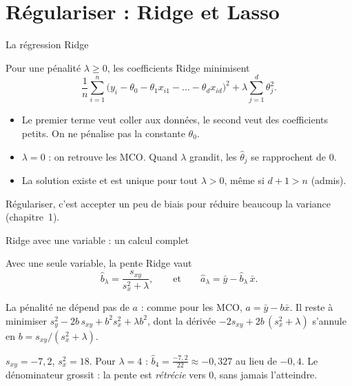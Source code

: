 \documentclass[aspectratio=169,11pt]{beamer}
\begin{document}
\section{Régulariser : Ridge et Lasso}

\begin{frame}{La régression Ridge}
  \begin{definition}[Ridge]
    Pour une pénalité $\lambda\ge0$, les coefficients Ridge minimisent
    \[
      \frac1n\sum_{i=1}^n\big(y_i-\theta_0-\theta_1x_{i1}-\dots-\theta_dx_{id}\big)^2+\lambda\sum_{j=1}^d\theta_j^2 .
    \]
  \end{definition}
  \begin{itemize}\small
    \item Le premier terme veut coller aux données, le second veut des coefficients petits. On ne pénalise pas la constante $\theta_0$.
    \item $\lambda=0$ : on retrouve les MCO. Quand $\lambda$ grandit, les $\hat\theta_j$ se rapprochent de $0$.
    \item La solution existe et est unique pour tout $\lambda>0$, même si $d+1>n$ (admis).
  \end{itemize}
  \begin{aretenir}
    Régulariser, c'est accepter un peu de biais pour réduire beaucoup la variance (chapitre~1).
  \end{aretenir}
\end{frame}

\begin{frame}{Ridge avec une variable : un calcul complet}
  \begin{proposition}
    Avec une seule variable, la pente Ridge vaut
    \[
      \hat b_\lambda=\frac{s_{xy}}{s_x^2+\lambda},\qquad\text{et}\qquad\hat a_\lambda=\bar y-\hat b_\lambda\,\bar x .
    \]
  \end{proposition}
  \begin{preuve}
    La pénalité ne dépend pas de $a$ : comme pour les MCO, $a=\bar y-b\bar x$. Il reste à minimiser
    $s_y^2-2b\,s_{xy}+b^2s_x^2+\lambda b^2$, dont la dérivée $-2s_{xy}+2b\,(s_x^2+\lambda)$ s'annule en $b=s_{xy}/(s_x^2+\lambda)$.
  \end{preuve}
  \begin{exemple}
    $s_{xy}=-7{,}2$, $s_x^2=18$. Pour $\lambda=4$ : $\hat b_4=\frac{-7{,}2}{22}\approx-0{,}327$ au lieu de $-0{,}4$.
    Le dénominateur grossit : la pente est \emph{rétrécie} vers $0$, sans jamais l'atteindre.
  \end{exemple}
\end{frame}
\end{document}
